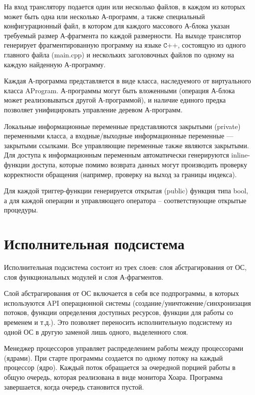 \documentclass[a4paper,11pt,draft]{article} %
\begin{document}
	
	\newpage
	На вход транслятору подается один или несколько файлов, в каждом из которых может
	быть одна или несколько А-программ, а также специальный конфигурационный файл, в котором
	для каждого массового А-блока указан требуемый размер А-фрагмента по каждой размерности.
	На выходе транслятор генерирует фрагментированную программу на языке $\texttt{C++}$, состоящую из
	одного главного файла (main.cpp) и нескольких заголовочных файлов по одному на каждую
	найденную А-программу.
	
	Каждая А-программа представляется в виде класса, наследуемого от виртуального класса
	AProgram. А-программы могут быть вложенными (операция А-блока может реализовываться
	другой А-программой), и наличие единого предка позволяет унифицировать управление деревом
	А-программ.
	
	Локальные информационные переменные представляются закрытыми (private) переменными
	класса, а входные/выходные информационные переменные --- закрытыми ссылками. Все управляющие переменные также являются закрытыми. Для доступа к информационным переменным
	автоматически генерируются inline-функции доступа, которые помимо возврата данных могут
	производить проверку корректности обращения (например, проверку на выход за границы индекса).
	
	Для каждой триггер-функции генерируется открытая (public) функция типа bool, а для каждой операции и управляющего оператора -- соответствующие открытые процедуры.
	
	\section{Исполнительная подсистема}
	Исполнительная подсистема состоит из трех слоев: слоя абстрагирования от ОС, слоя функциональных модулей и слоя А-фрагментов.
	
	Слой абстрагирования от ОС включается в себя все подпрограммы, в которых используются
	API операционной системы (создание/уничтожение/синхронизация потоков, функции определения доступных ресурсов, функции для работы со временем и т.д.). Это позволяет переносить
	исполнительную подсистему из одной ОС в другую заменой лишь одного, выделенного слоя.
	
	Менеджер процессоров управляет распределением работы между процессорами (ядрами).
	При старте программы создается по одному потоку на каждый процессор (ядро). Каждый поток
	обращается за очередной порцией работы в общую очередь, которая реализована в виде монитора
	Хоара. Программа завершается, когда очередь становится пустой.
	
\end{document}
